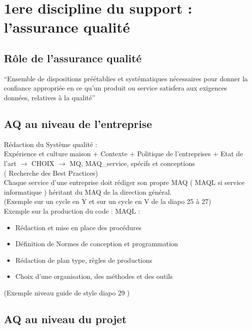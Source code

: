 \section{1ere discipline du support : l'assurance qualité}

	\subsection{Rôle de l’assurance qualité}

“Ensemble de dispositions préétablies et systématiques nécessaires pour donner la confiance appropriée en ce qu’un produit ou service satisfera aux exigences données, relatives à la qualité”


	\subsection{AQ au niveau de l’entreprise}

Rédaction du Système qualité :\\
	Expérience et culture maison + Contexte + Politique de l’entreprises + Etat de l’art
		$\rightarrow$ CHOIX $\rightarrow$ MQ, MAQ\_service, spécifs et conceptions\\
			( Recherche des Best Practices)\\

Chaque service d’une entreprise doit rédiger son propre MAQ ( MAQL si service informatique ) héritant du MAQ de la direction général.\\

(Exemple sur un cycle en Y et sur un cycle en V de la diapo 25 à 27)\\

Exemple sur la production du code : MAQL :
\begin{itemize}
\item Rédaction et mise en place des procédures
\item Définition de Normes de conception et programmation
\item Rédaction de plan type, règles de productions
\item Choix d’une organisation, des méthodes et des outils
\end{itemize}

(Exemple niveau guide de style diapo 29 )

	\subsection{AQ au niveau du projet}

